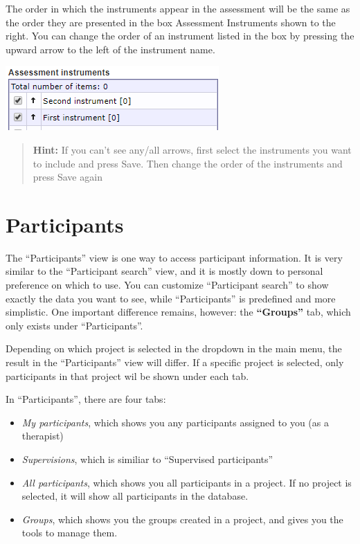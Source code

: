 \documentclass[]{book}
\providecommand{\tightlist}{%
  \setlength{\itemsep}{0pt}\setlength{\parskip}{0pt}}
\begin{document}
The order in which the instruments appear in the assessment will be the same as the order they are presented in the box Assessment Instruments shown to the right. You can change the order of an instrument listed in the box by pressing the upward arrow to the left of the instrument name.

\includegraphics{images/assessment-instrument.png}

\begin{quote}
\textbf{Hint:} If you can't see any/all arrows, first select the instruments you want to include and press Save. Then change the order of the instruments and press Save again
\end{quote}

\hypertarget{participants}{%
\chapter{Participants}\label{participants}}

The ``Participants'' view is one way to access participant information. It is very similar to the ``Participant search'' view, and it is mostly down to personal preference on which to use. You can customize ``Participant search'' to show exactly the data you want to see, while ``Participants'' is predefined and more simplistic. One important difference remains, however: the \textbf{``Groups''} tab, which only exists under ``Participants''.

Depending on which project is selected in the dropdown in the main menu, the result in the ``Participants'' view will differ. If a specific project is selected, only participants in that project wil be shown under each tab.

In ``Participants'', there are four tabs:

\begin{itemize}
\tightlist
\item
  \emph{My participants}, which shows you any participants assigned to you (as a therapist)
\item
  \emph{Supervisions}, which is similiar to ``Supervised participants''
\item
  \emph{All participants}, which shows you all participants in a project. If no project is selected, it will show all participants in the database.
\item
  \emph{Groups}, which shows you the groups created in a project, and gives you the tools to manage them.
\end{itemize}
\end{document}
